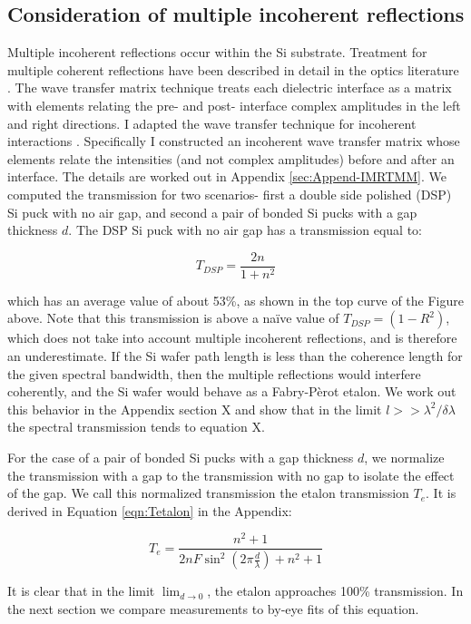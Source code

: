 \documentclass[osajnl,preprint,showpacs,superscriptaddress,12pt]{revtex4-1} %
\begin{document}
\subsection{Consideration of multiple incoherent reflections}
\label{secTheory}
Multiple incoherent reflections occur within the Si substrate.  Treatment for multiple coherent reflections have been described in detail in the optics literature \cite{2007fuph.book.....S}.  The wave transfer matrix technique treats each dielectric interface as a matrix with elements relating the pre- and post- interface complex amplitudes in the left and right directions.  I adapted the wave transfer technique for incoherent interactions \cite{2002ApOpt..41.3978K}.  Specifically I constructed an incoherent wave transfer matrix whose elements relate the intensities (and not complex amplitudes) before and after an interface.  The details are worked out in Appendix \ref{sec:Append-IMRTMM}.  We computed the transmission for two scenarios- first a double side polished (DSP) Si puck with no air gap, and second a pair of bonded Si pucks with a gap thickness $d$.  The DSP Si puck with no air gap has a transmission equal to:

$$
T_{DSP} = \frac{2n}{1+n^2}
$$

which has an average value of about 53\%, as shown in the top curve of the Figure above.  Note that this transmission is above a na\"ive value of $T_{DSP}=(1-R^2)$, which does not take into account multiple incoherent reflections, and is therefore an underestimate.  If the Si wafer path length is less than the coherence length for the given spectral bandwidth, then the multiple reflections would interfere coherently, and the Si wafer would behave as a Fabry-P\`erot etalon.  We work out this behavior in the Appendix section X and show that in the limit $l>> \lambda^2 / \delta \lambda $ the spectral transmission tends to equation X.  

For the case of a pair of bonded Si pucks with a gap thickness $d$, we normalize the transmission with a gap to the transmission with no gap to isolate the effect of the gap.  We call this normalized transmission the etalon transmission $T_{e}$.  It is derived in Equation \ref{eqn:Tetalon} in the Appendix:


$$T_{e} = \frac{n^2+1}{2 n F \sin ^2(2\pi \frac{d}{\lambda})+n^2+1} \label{eqFP}$$


It is clear that in the limit $\lim_{d \rightarrow 0}$, the etalon approaches 100\% transmission.  In the next section we compare measurements to by-eye fits of this equation.
\end{document}
